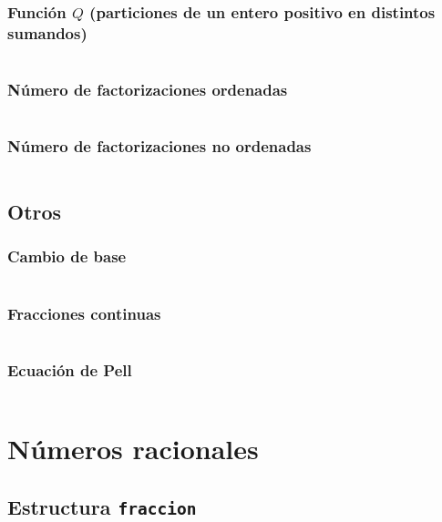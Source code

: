 \documentclass[11pt]{article}
\begin{document}
			\subsubsection{Función $Q$ (particiones de un entero positivo en distintos sumandos)}
			\inputminted[tabsize=2,breaklines,firstline=578,lastline=629,fontsize=\small]{c++}{numberTheory.cpp}
			
			\subsubsection{Número de factorizaciones ordenadas}
			\inputminted[tabsize=2,breaklines,firstline=778,lastline=806,fontsize=\small]{c++}{numberTheory.cpp}
			
			\subsubsection{Número de factorizaciones no ordenadas}
			\inputminted[tabsize=2,breaklines,firstline=808,lastline=834,fontsize=\small]{c++}{numberTheory.cpp}
			
		\subsection{Otros}
			\subsubsection{Cambio de base}
			\inputminted[tabsize=2,breaklines,firstline=460,lastline=487,fontsize=\small]{c++}{numberTheory.cpp}
			
			\subsubsection{Fracciones continuas}
			\inputminted[tabsize=2,breaklines,firstline=631,lastline=671,fontsize=\small]{c++}{numberTheory.cpp}
			
			\subsubsection{Ecuación de Pell}
			\inputminted[tabsize=2,breaklines,firstline=673,lastline=686,fontsize=\small]{c++}{numberTheory.cpp}
			
	\newpage
	\section{Números racionales}
		\subsection{Estructura \texttt{fraccion}}
		\inputminted[tabsize=2,breaklines,firstline=7,lastline=123,fontsize=\small]{c++}{fraccion.cpp}
		
\end{document}
